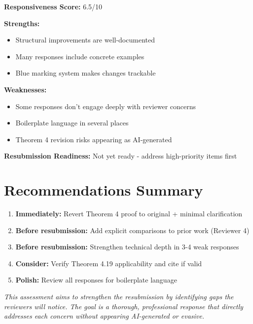 \documentclass[11pt]{article}
\begin{document}
\textbf{Responsiveness Score:} 6.5/10

\textbf{Strengths:}
\begin{itemize}
\item Structural improvements are well-documented
\item Many responses include concrete examples
\item Blue marking system makes changes trackable
\end{itemize}

\textbf{Weaknesses:}
\begin{itemize}
\item Some responses don't engage deeply with reviewer concerns
\item Boilerplate language in several places
\item Theorem 4 revision risks appearing as AI-generated
\end{itemize}

\textbf{Resubmission Readiness:} \textcolor{warning}{Not yet ready - address high-priority items first}

\section{Recommendations Summary}

\begin{enumerate}
\item \textbf{Immediately:} Revert Theorem 4 proof to original + minimal clarification
\item \textbf{Before resubmission:} Add explicit comparisons to prior work (Reviewer 4)
\item \textbf{Before resubmission:} Strengthen technical depth in 3-4 weak responses
\item \textbf{Consider:} Verify Theorem 4.19 applicability and cite if valid
\item \textbf{Polish:} Review all responses for boilerplate language
\end{enumerate}

\vspace{1cm}

\noindent\textit{This assessment aims to strengthen the resubmission by identifying gaps the reviewers will notice. The goal is a thorough, professional response that directly addresses each concern without appearing AI-generated or evasive.}
\end{document}
